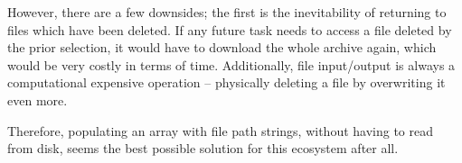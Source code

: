However, there are a few downsides; the first is the inevitability of returning to files which have been deleted. If any future task needs to access a file deleted by the prior selection, it would have to download the whole archive again, which would be very costly in terms of time. Additionally, file input/output is always a computational expensive operation -- physically deleting a file by overwriting it even more.

Therefore, populating an array with file path strings, without having to read from disk, seems the best possible solution for this ecosystem after all.
